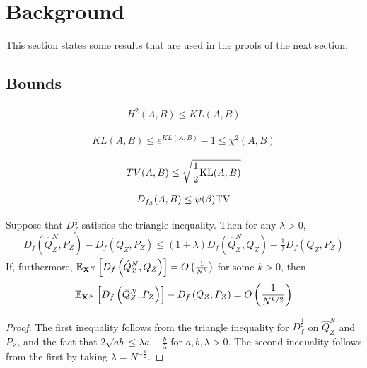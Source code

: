 \section{Background}

This section states some results that are used in the proofs of the next section.


\subsection{Bounds}


\begin{lemma}
\begin{align*}
H^2(A, B) \leq KL(A,B) 
\end{align*}
\end{lemma}

\begin{lemma}
\begin{align*}
KL(A,B) \leq e^{KL(A, B)} - 1 \leq \chi^2(A, B)
\end{align*}
\end{lemma}

\begin{lemma}
\begin{align*}
TV(A,B)  \leq \sqrt{\frac{1}{2}\mathrm{KL}(A, B)}
\end{align*}
\end{lemma}

\begin{lemma}
\begin{align*}
D_{f_\beta}(A,B) \leq \psi(\beta) \mathrm{TV}
\end{align*}
\end{lemma}

\begin{lemma}\label{lemma:hilbertian-triangle}
Suppose that $D_f^{\frac{1}{2}}$ satisfies the triangle inequality.
Then for any $\lambda>0$,
\begin{align*}
    D_f\left(\hat{Q}^N_Z , P_Z\right) - D_f\left(Q_{Z} , P_Z\right) \leq (1+\lambda) D_f\left(\hat{Q}^N_Z , Q_Z \right) +  \frac{1}{\lambda} D_f\left(Q_{Z} , P_Z \right)
\end{align*}
If, furthermore, $\mathbb{E}_{\mathbf{X}^N}\left[ D_f\left(\hat{Q}^N_Z , Q_Z\right)\right] = O\left( \frac{1}{N^k} \right)$ 
for some $k>0$, 
then
\begin{align*}
    \mathbb{E}_{\mathbf{X}^N}\left[ D_f\left(\hat{Q}^N_Z , P_Z\right) \right] - D_f\left(Q_{Z} , P_Z\right) = O\left( \frac{1}{N^{k/2}} \right)
\end{align*}
\end{lemma}
\begin{proof}
The first inequality follows from the triangle inequality for $D_f^{\frac{1}{2}}$ on $\hat{Q}^N_Z$ and $P_Z$, and the fact that $2\sqrt{ab} \leq \lambda a + \frac{b}{\lambda}$ for ${a, b, \lambda>0}$.
The second inequality follows from the first by taking $\lambda = N^{-\frac{k}{2}}$.
\end{proof}


